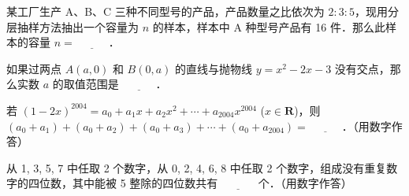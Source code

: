 \begin{question}
某工厂生产 A、B、C 三种不同型号的产品，产品数量之比依次为 $2 : 3 : 5$，现用分层抽样方法抽出一个容量为 $n$ 的样本，样本中 A 种型号产品有 16 件．那么此样本的容量 $n = \underline{\hspace{3em}}$．

\end{question}
\begin{question}
如果过两点 $A(a, 0)$ 和 $B(0, a)$ 的直线与抛物线 $y = x^2 - 2x - 3$ 没有交点，那么实数 $a$ 的取值范围是 $\underline{\hspace{3em}}$．

\end{question}
\begin{question}
若 $(1 - 2x)^{2004} = a_0 + a_1 x + a_2 x^2 + \cdots + a_{2004} x^{2004}$ ($x \in \mathbf{R}$)，则 $(a_0 + a_1) + (a_0 + a_2) + (a_0 + a_3) + \cdots + (a_0 + a_{2004}) = \underline{\hspace{3em}}$．（用数字作答）

\end{question}
\begin{question}
从 1, 3, 5, 7 中任取 2 个数字，从 0, 2, 4, 6, 8 中任取 2 个数字，组成没有重复数字的四位数，其中能被 5 整除的四位数共有 $\underline{\hspace{3em}}$ 个．（用数字作答）

\end{question}

